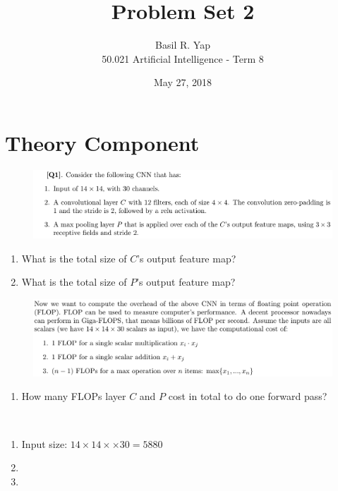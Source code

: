 \documentclass[12pt]{article}
\newenvironment{solution}[2][Solution]{\begin{trivlist}
\item[\hskip \labelsep {\bfseries #1}]}{\end{trivlist}}
\begin{document}
 
 
\title{Problem Set 2}%
\author{Basil R. Yap\\ %
50.021 Artificial Intelligence - Term 8} %
\date{May 27, 2018}
\maketitle

\section{Theory Component}
\begin{figure}[h!]
\includegraphics[width=\linewidth]{./assets/201806022206.png}
\end{figure}
\begin{enumerate}[label=\alph*)]
\item What is the total size of $C$'s output feature map?
\item What is the total size of $P$'s output feature map? 
\end{enumerate}
\begin{figure}[h!]
\includegraphics[width=\linewidth]{./assets/201806022208.png}
\end{figure}
\begin{enumerate}
\item[c)] How many FLOPs layer $C$ and $P$ cost in total to do one forward pass?
\end{enumerate}

\begin{solution}{}~
\begin{enumerate}[label=\alph*)]
\item Input size: $14\times14\times\times30=5880$\\


\item 
\item 
\end{enumerate}
\end{solution}
\end{document}
